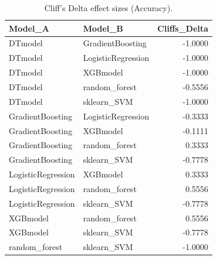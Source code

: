 \begin{table}[t]
\centering
\begin{tabular}{llr}
\toprule
Model_A & Model_B & Cliffs_Delta \\
\midrule
DTmodel & GradientBoosting & -1.0000 \\
DTmodel & LogisticRegression & -1.0000 \\
DTmodel & XGBmodel & -1.0000 \\
DTmodel & random_forest & -0.5556 \\
DTmodel & sklearn_SVM & -1.0000 \\
GradientBoosting & LogisticRegression & -0.3333 \\
GradientBoosting & XGBmodel & -0.1111 \\
GradientBoosting & random_forest & 0.3333 \\
GradientBoosting & sklearn_SVM & -0.7778 \\
LogisticRegression & XGBmodel & 0.3333 \\
LogisticRegression & random_forest & 0.5556 \\
LogisticRegression & sklearn_SVM & -0.7778 \\
XGBmodel & random_forest & 0.5556 \\
XGBmodel & sklearn_SVM & -0.7778 \\
random_forest & sklearn_SVM & -1.0000 \\
\bottomrule
\end{tabular}
\caption{Cliff's Delta effect sizes (Accuracy).}
\label{tab:cliffs_Accuracy}
\end{table}